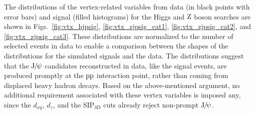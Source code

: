 		The distributions of the vertex-related variables from data (in black points with error bars) and signal (filled histograms) for the Higgs and $\mathrm{Z}$ boson searches are shown in Figs.~\ref{fig:vtx_hjpsig}, \ref{fig:vtx_zjpsig_cat1}, \ref{fig:vtx_zjpsig_cat2}, and \ref{fig:vtx_zjpsig_cat3}. These distributions are normalized to the number of selected events in data to enable a comparison between the shapes of the distributions for the simulated signals and the data. 
		The distributions suggest that the ${\mathrm{J}\hspace{-.08em}/\hspace{-.14em}\psi}$ candidates reconstructed in data, like the signal events, are produced promptly at the $\mathrm{p}\mathrm{p}$ interaction point, rather than coming from displaced heavy hadron decays.
		 Based on the above-mentioned argument, no additional requirement associated with these vertex variables is imposed any, since the $d_{xy}$, $d_{z}$, and the SIP$_{\text{3D}}$ cuts already reject non-prompt ${\mathrm{J}\hspace{-.08em}/\hspace{-.14em}\psi}$.
		
